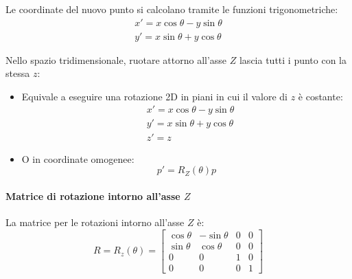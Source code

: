 \begin{theorem}
\begin{center}
    \end{center}
    Le coordinate del nuovo punto si calcolano tramite le funzioni trigonometriche:
    \begin{align*}
        x' = x \cos \theta - y \sin \theta \\
        y' = x \sin \theta + y \cos \theta
    \end{align*}
\end{theorem}

\begin{theorem}
    Nello spazio tridimensionale, ruotare attorno all'asse $Z$ lascia tutti i punto con la stessa $ z $:
    \begin{itemize}
        \item Equivale a eseguire una rotazione 2D in piani in cui il valore di $z$ è costante:
              \begin{align*}
                   & x' = x \cos \theta - y \sin \theta \\
                   & y' = x \sin \theta + y \cos \theta \\
                   & z' = z
              \end{align*}
        \item O in coordinate omogenee:
              \[
                  p' = R_{Z}(\theta)p
              \]
    \end{itemize}

\end{theorem}
\paragraph{Matrice di rotazione intorno all'asse $ Z $}
La matrice per le rotazioni intorno all'asse $ Z $ è:
\[
    R = R_{z}(\theta) = \begin{bmatrix}
        \cos \theta & - \sin \theta & 0 & 0 \\
        \sin \theta & \cos \theta   & 0 & 0 \\
        0           & 0             & 1 & 0 \\
        0           & 0             & 0 & 1
    \end{bmatrix}
\]


